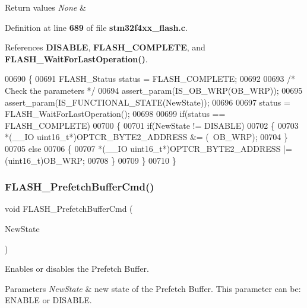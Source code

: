 \begin{DoxyRetVals}{Return values}
{\em None} & \\
\hline
\end{DoxyRetVals}


Definition at line \textbf{ 689} of file \textbf{ stm32f4xx\+\_\+flash.\+c}.



References \textbf{ D\+I\+S\+A\+B\+LE}, \textbf{ F\+L\+A\+S\+H\+\_\+\+C\+O\+M\+P\+L\+E\+TE}, and \textbf{ F\+L\+A\+S\+H\+\_\+\+Wait\+For\+Last\+Operation()}.


\begin{DoxyCode}
00690 \{ 
00691   FLASH_Status status = FLASH_COMPLETE;
00692   
00693   \textcolor{comment}{/* Check the parameters */}
00694   assert_param(IS_OB_WRP(OB\_WRP));
00695   assert_param(IS_FUNCTIONAL_STATE(NewState));
00696     
00697   status = FLASH_WaitForLastOperation();
00698 
00699   \textcolor{keywordflow}{if}(status == FLASH_COMPLETE)
00700   \{ 
00701     \textcolor{keywordflow}{if}(NewState != DISABLE)
00702     \{
00703       *(\_\_IO uint16\_t*)OPTCR_BYTE2_ADDRESS &= (~OB\_WRP);
00704     \}
00705     \textcolor{keywordflow}{else}
00706     \{
00707       *(\_\_IO uint16\_t*)OPTCR_BYTE2_ADDRESS |= (uint16\_t)OB\_WRP;
00708     \}
00709   \}
00710 \}
\end{DoxyCode}
\mbox{\label{group__FLASH_gafaa24b6176b587bdda46abbe755af986}} 
\subsubsection{F\+L\+A\+S\+H\+\_\+\+Prefetch\+Buffer\+Cmd()}
{\footnotesize\ttfamily void F\+L\+A\+S\+H\+\_\+\+Prefetch\+Buffer\+Cmd (\begin{DoxyParamCaption}\item[{\textbf{ Functional\+State}}]{New\+State }\end{DoxyParamCaption})}



Enables or disables the Prefetch Buffer. 


\begin{DoxyParams}{Parameters}
{\em New\+State} & new state of the Prefetch Buffer. This parameter can be\+: E\+N\+A\+B\+LE or D\+I\+S\+A\+B\+LE. \\
\hline
\end{DoxyParams}

